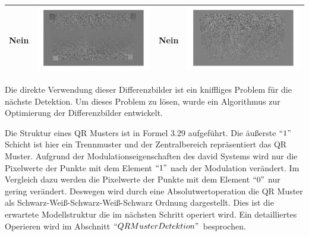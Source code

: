 \begin{table}[htb]
\begin{tabular}{|p{2cm}<{\centering}|c|p{2cm}<{\centering}|c|}
	Nein & \includegraphics[scale=0.15]{images/3_Ersteverfahren/Differenzbild/4halbschwaryhalbweis.pdf}& Nein & \includegraphics[scale=0.15]{images/3_Ersteverfahren/Differenzbild/5aufheben.pdf}\\

	\bottomrule
	\end{tabular}
\end{table} 


Die direkte Verwendung dieser Differenzbilder ist ein kniffliges Problem für die nächste Detektion. Um dieses Problem zu lösen, wurde ein Algorithmus zur Optimierung der Differenzbilder entwickelt.

Die Struktur eines QR Musters ist in Formel 3.29 aufgeführt. Die äußerste $``1"$ Schicht ist hier ein Trennmuster und der Zentralbereich repräsentiert das QR Muster. Aufgrund der Modulationseigenschaften des \gls{david} Systems wird nur die Pixelwerte der Punkte mit dem Element $``1"$ nach der Modulation verändert. Im Vergleich dazu werden die Pixelwerte der Punkte mit dem Element $``0"$ nur gering verändert. Deswegen wird durch eine Absolutwertoperation die QR Muster als Schwarz-Weiß-Schwarz-Weiß-Schwarz Ordnung dargestellt. Dies ist die erwartete Modellstruktur die im nächsten Schritt operiert wird. Ein detailliertes Operieren wird im Abschnitt $ ``QR Muster Detektion" $ besprochen.

